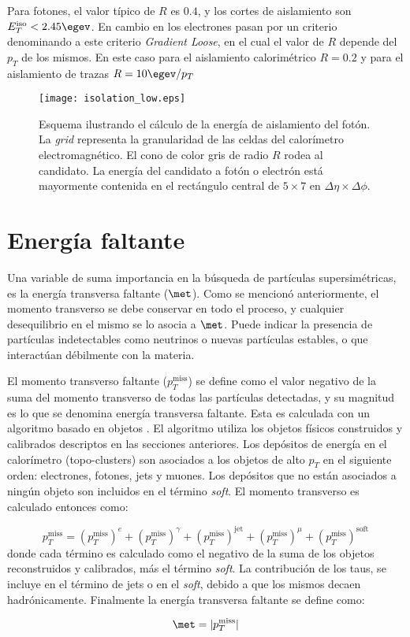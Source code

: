 Para fotones, el valor típico de $R$ es $0.4$, y los cortes de aislamiento son $E_{T}^{\text{iso}}<2.45 \egev$. En cambio en los electrones pasan por un criterio denominando a este criterio \textit{Gradient Loose}, en el cual el valor de $R$ depende del $p_{T}$ de los mismos. En este caso para el aislamiento calorimétrico $R=0.2$ y para el aislamiento de trazas $R=10\egev/p_{T}$

\begin{figure}
\centering
\texttt{[image: isolation\_low.eps]}
\caption{Esquema ilustrando el cálculo de la energía de aislamiento del fotón. La \textit{grid} representa la granularidad de las celdas del calorímetro electromagnético. El cono de color gris de radio $R$ rodea al candidato. La energía del candidato a fotón o electrón está mayormente contenida en el rectángulo central de $5 \times 7$ en $\Delta\eta \times \Delta\phi$.}
\label{isolation}
\end{figure}

\section{Energía faltante}

Una variable de suma importancia en la búsqueda de partículas supersimétricas, es la energía transversa faltante ($\met$). Como se mencionó anteriormente, el momento transverso se debe conservar en todo el proceso, y cualquier desequilibrio en el mismo se lo asocia a $\met$. Puede indicar la presencia de partículas indetectables como neutrinos o nuevas partículas estables, o que interactúan débilmente con la materia.

El momento transverso faltante ($p_{T}^{\text{miss}}$) se define como el valor negativo de la suma del momento transverso de todas las partículas detectadas, y su magnitud es lo que se denomina energía transversa faltante. Esta es calculada con un algoritmo basado en objetos \cite{Khoo:2012749}. El algoritmo utiliza los objetos físicos construidos y calibrados descriptos en las secciones anteriores. Los depósitos de energía en el calorímetro (topo-clusters) son asociados a los objetos de alto $p_{T}$ en el siguiente orden: electrones, fotones, jets y muones. Los depósitos que no están asociados a ningún objeto son incluidos en el término \textit{soft}. El momento transverso es calculado entonces como:

\begin{equation}
p_{T}^{\text{miss}}=\left(p_{T}^{\text{miss}}\right)^{e} + \left(p_{T}^{\text{miss}}\right)^{\gamma} + \left(p_{T}^{\text{miss}}\right)^{\text{jet}} +\left(p_{T}^{\text{miss}}\right)^{\mu} + \left(p_{T}^{\text{miss}}\right)^{\text{soft}}
\end{equation}
%
donde cada término es calculado como el negativo de la suma de los objetos reconstruidos y calibrados, más el término \textit{soft}. La contribución de los taus, se incluye en el término de jets o en el \textit{soft}, debido a que los mismos decaen hadrónicamente. Finalmente la energía transversa faltante se define como:

\begin{equation}
\met=|p_{T}^{\text{miss}}|
\end{equation}

